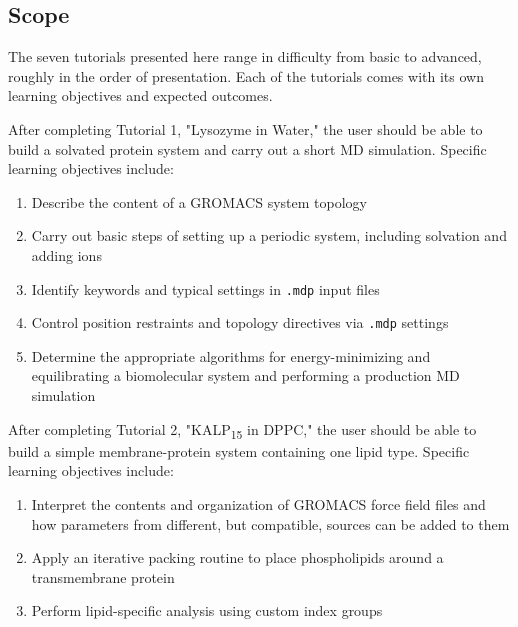 \documentclass[9pt,tutorial,pubversion]{livecoms}
\begin{document}
\subsection{Scope}



The seven tutorials presented here range in difficulty from basic to advanced, roughly in the order of presentation. Each of the tutorials comes with its own learning objectives and expected outcomes.

After completing Tutorial 1, "Lysozyme in Water," the user should be able to build a solvated protein system and carry out a short MD simulation. Specific learning objectives include:
\begin{enumerate}
	\item Describe the content of a GROMACS system topology
	\item Carry out basic steps of setting up a periodic system, including solvation and adding ions
	\item Identify keywords and typical settings in \texttt{.mdp} input files
	\item Control position restraints and topology directives via \texttt{.mdp} settings
	\item Determine the appropriate algorithms for energy-minimizing and equilibrating a biomolecular system and performing a production MD simulation
\end{enumerate}

After completing Tutorial 2, "KALP\textsubscript{15} in DPPC," the user should be able to build a simple membrane-protein system containing one lipid type. Specific learning objectives include:
\begin{enumerate}
	\item Interpret the contents and organization of GROMACS force field files and how parameters from different, but compatible, sources can be added to them
	\item Apply an iterative packing routine to place phospholipids around a transmembrane protein
	\item Perform lipid-specific analysis using custom index groups
\end{enumerate}
\end{document}
